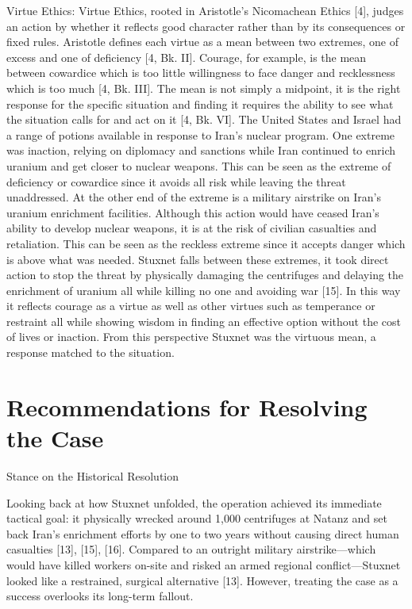 Virtue Ethics:
Virtue Ethics, rooted in Aristotle’s Nicomachean Ethics [4], judges an action by whether it reflects good character rather than by its consequences or fixed rules. Aristotle defines each virtue as a mean between two extremes, one of excess and one of deficiency [4, Bk. II]. Courage, for example, is the mean between cowardice which is too little willingness to face danger and recklessness which is too much [4, Bk. III]. The mean is not simply a midpoint, it is the right response for the specific situation and finding it requires the ability to see what the situation calls for and act on it [4, Bk. VI]. The United States and Israel had a range of potions available in response to Iran’s nuclear program. One extreme was inaction, relying on diplomacy and sanctions while Iran continued to enrich uranium and get closer to nuclear weapons. This can be seen as the extreme of deficiency or cowardice since it avoids all risk while leaving the threat unaddressed. At the other end of the extreme is a military airstrike on Iran’s uranium enrichment facilities. Although this action would have ceased Iran’s ability to develop nuclear weapons, it is at the risk of civilian casualties and retaliation. This can be seen as the reckless extreme since it accepts danger which is above what was needed. Stuxnet falls between these extremes, it took direct action to stop the threat by physically damaging the centrifuges and delaying the enrichment of uranium all while killing no one and avoiding war [15]. In this way it reflects courage as a virtue as well as other virtues such as temperance or restraint all while showing wisdom in finding an effective option without the cost of lives or inaction. From this perspective Stuxnet was the virtuous mean, a response matched to the situation.

\section{Recommendations for Resolving the Case}
Stance on the Historical Resolution

Looking back at how Stuxnet unfolded, the operation achieved its immediate tactical goal: it physically wrecked around 1,000 centrifuges at Natanz and set back Iran's enrichment efforts by one to two years without causing direct human casualties [13], [15], [16]. Compared to an outright military airstrike—which would have killed workers on-site and risked an armed regional conflict—Stuxnet looked like a restrained, surgical alternative [13]. However, treating the case as a success overlooks its long-term fallout.


